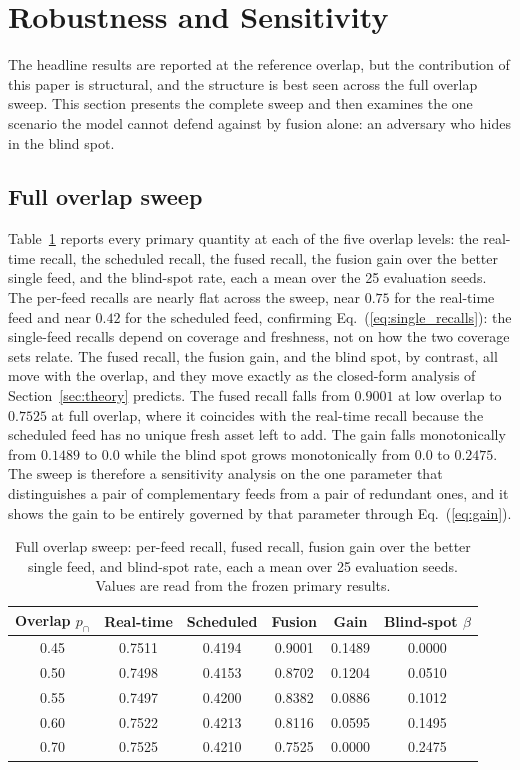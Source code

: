 \documentclass[journal]{IEEEtran}
\begin{document}
\section{Robustness and Sensitivity}
\label{sec:robustness}
The headline results are reported at the reference overlap, but the contribution of this paper is
structural, and the structure is best seen across the full overlap sweep. This section presents the
complete sweep and then examines the one scenario the model cannot defend against by fusion alone:
an adversary who hides in the blind spot.

\subsection{Full overlap sweep}
Table~\ref{tab:sweep} reports every primary quantity at each of the five overlap levels: the
real-time recall, the scheduled recall, the fused recall, the fusion gain over the better single
feed, and the blind-spot rate, each a mean over the 25 evaluation seeds. The per-feed recalls are
nearly flat across the sweep, near $0.75$ for the real-time feed and near $0.42$ for the scheduled
feed, confirming Eq.~(\ref{eq:single_recalls}): the single-feed recalls depend on coverage and
freshness, not on how the two coverage sets relate. The fused recall, the fusion gain, and the
blind spot, by contrast, all move with the overlap, and they move exactly as the closed-form
analysis of Section~\ref{sec:theory} predicts. The fused recall falls from $0.9001$ at low overlap
to $0.7525$ at full overlap, where it coincides with the real-time recall because the scheduled
feed has no unique fresh asset left to add. The gain falls monotonically from $0.1489$ to $0.0$
while the blind spot grows monotonically from $0.0$ to $0.2475$. The sweep is therefore a
sensitivity analysis on the one parameter that distinguishes a pair of complementary feeds from a
pair of redundant ones, and it shows the gain to be entirely governed by that parameter through
Eq.~(\ref{eq:gain}).

\begin{table}[t]
\centering
\caption{Full overlap sweep: per-feed recall, fused recall, fusion gain over the better single feed,
and blind-spot rate, each a mean over 25 evaluation seeds. Values are read from the frozen primary
results.}
\label{tab:sweep}
\footnotesize
\setlength{\tabcolsep}{4pt}
\begin{tabular}{@{}cccccc@{}}
\toprule
Overlap $p_{\cap}$ & Real-time & Scheduled & Fusion & Gain & Blind-spot $\beta$ \\
\midrule
0.45 & 0.7511 & 0.4194 & 0.9001 & 0.1489 & 0.0000 \\
0.50 & 0.7498 & 0.4153 & 0.8702 & 0.1204 & 0.0510 \\
0.55 & 0.7497 & 0.4200 & 0.8382 & 0.0886 & 0.1012 \\
0.60 & 0.7522 & 0.4213 & 0.8116 & 0.0595 & 0.1495 \\
0.70 & 0.7525 & 0.4210 & 0.7525 & 0.0000 & 0.2475 \\
\bottomrule
\end{tabular}
\end{table}
\end{document}
